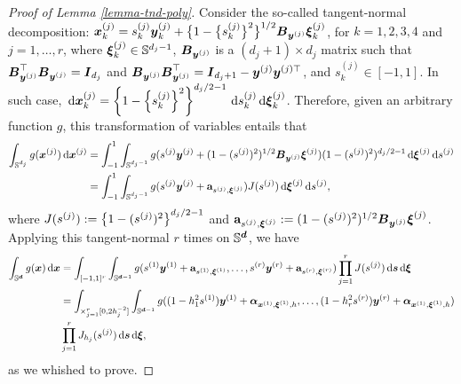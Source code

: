 \documentclass[oneside,11pt]{article}
\begin{document}
\begin{proof}[Proof of Lemma \ref{lemma-tnd-poly}]
    Consider the so-called tangent-normal decomposition: $\boldsymbol{x}_k^{(j)} = s_k^{(j)} \boldsymbol{y}_k^{(j)} + \big\{1 - \big\{s_k^{(j)}\big\}^2\big\}^{1/2} \boldsymbol{B}_{\boldsymbol{y}^{(j)}} \boldsymbol\xi_k^{(j)}$, for $k = 1,2,3,4$ and $j =1,\dots,r$, where $\boldsymbol\xi_k^{(j)} \in \mathbb{S}^{d_j-1}$, $\boldsymbol{B}_{\boldsymbol{y}^{(j)}}$  is a $(d_j+1) \times d_j$ matrix such that $\boldsymbol{B}_{\boldsymbol{y}^{(j)}}^{\top} \boldsymbol{B}_{\boldsymbol{y}^{(j)}} = \boldsymbol{I}_{d_j}$ and $\boldsymbol{B}_{\boldsymbol{y}^{(j)}} \boldsymbol{B}_{\boldsymbol{y}^{(j)}}^{\top} = \boldsymbol{I}_{d_j+1} - \boldsymbol{y}^{(j)} \boldsymbol{y}^{(j) \top}$, and $s_k^{(j)} \in [-1,1]$. In such case, $\,\mathrm{d} \boldsymbol{x}_k^{(j)} = \left\{1 - \left\{s_k^{(j)}\right\}^2\right\}^{d_j/2 -1} \,\mathrm{d} s_k^{(j)} \,\mathrm{d} \boldsymbol\xi_k^{(j)}$. Therefore, given an arbitrary function $g$, this transformation of variables entails that
\begin{align*}
    \int_{\mathbb{S}^{d_j}} g(\boldsymbol{x}^{(j)}) \,\mathrm{d} \boldsymbol{x}^{(j)} &= \int_{-1}^{1} \int_{\mathbb{S}^{d_j-1}} g(s^{(j)} \boldsymbol{y}^{(j)} + (1-(s^{(j)})^2)^{1/2} \boldsymbol{B}_{\boldsymbol{y}^{(j)}} \boldsymbol\xi^{(j)}) (1-(s^{(j)})^2)^{d_j/2 -1} \,\mathrm{d} \boldsymbol\xi^{(j)} \,\mathrm{d} s^{(j)}\\
    &= \int_{-1}^{1} \int_{\mathbb{S}^{d_j-1}} g(s^{(j)} \boldsymbol{y}^{(j)} + \mathbf{a}_{s^{(j)},\boldsymbol\xi^{(j)}}) J(s^{(j)}) \,\mathrm{d} \boldsymbol\xi^{(j)} \,\mathrm{d} s^{(j)},
\end{align*}
where $J(s^{(j)}) := \left\{1 - (s^{(j)})^2\right\}^{d_j/2 -1}$ and $\mathbf{a}_{s^{(j)},\boldsymbol\xi^{(j)}}:= (1-(s^{(j)})^2)^{1/2} \boldsymbol{B}_{\boldsymbol{y}^{(j)}} \boldsymbol\xi^{(j)}$. Applying this tangent-normal $r$ times on $\mathbb{S}^{\boldsymbol{d}}$, we have
\begin{align*}
    \int_{\mathbb{S}^{\boldsymbol{d}}} g(\boldsymbol{x}) \,\mathrm{d} \boldsymbol{x} &= \int_{[-1,1]^r} \int_{\mathbb{S}^{\boldsymbol{d}-1}} g(s^{(1)} \boldsymbol{y}^{(1)} + \mathbf{a}_{s^{(1)},\boldsymbol\xi^{(1)}},\ldots, s^{(r)} \boldsymbol{y}^{(r)} + \mathbf{a}_{s^{(r)},\boldsymbol\xi^{(r)}}) \prod_{j=1}^r J(s^{(j)}) \,\mathrm{d} \boldsymbol{s}\,\mathrm{d} \boldsymbol\xi \\
    &= \int_{\times_{j=1}^r[0,2h_j^{-2}]} \int_{\mathbb{S}^{\boldsymbol{d}-1}} g((1-h^2_1s^{(1)}) \boldsymbol{y}^{(1)} + \boldsymbol\alpha_{\boldsymbol{x}^{(1)},\boldsymbol\xi^{(1)},h},\ldots, (1-h^2_r s^{(r)}) \boldsymbol{y}^{(r)} + \boldsymbol\alpha_{\boldsymbol{x}^{(1)},\boldsymbol\xi^{(1)},h}) \\
    & \prod_{j=1}^r J_{h_j}(s^{(j)}) \,\mathrm{d} \boldsymbol{s}\,\mathrm{d} \boldsymbol\xi,
\end{align*}
as we whished to prove.
\end{proof}
\end{document}
